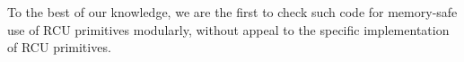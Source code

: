 To the best of our knowledge, we are the first to check such code for memory-safe use of RCU primitives modularly, without appeal to the specific implementation of RCU primitives.

